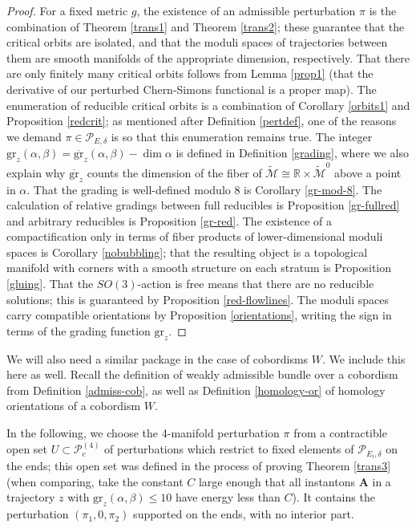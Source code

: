 \documentclass[10pt,a4paper]{amsart}
\theoremstyle{definition}
\theoremstyle{remark}
\numberwithin{figure}{qchap}
\begin{document}
\begin{proof}For a fixed metric $g$, the existence of an admissible perturbation $\pi$ is the combination of Theorem \ref{trans1} and Theorem \ref{trans2}; these guarantee that the critical orbits are isolated, and that the moduli spaces of trajectories between them are smooth manifolds of the appropriate dimension, respectively. That there are only finitely many critical orbits follows from Lemma \ref{prop1} (that the derivative of our perturbed Chern-Simons functional is a proper map). The enumeration of reducible critical orbits is a combination of Corollary \ref{orbits1} and Proposition \ref{redcrit}; as mentioned after Definition \ref{pertdef}, one of the reasons we demand $\pi \in \mathcal P_{E,\delta}$ is so that this enumeration remains true. The integer $\text{gr}_z(\alpha, \beta) = \overline{\text{gr}}_z(\alpha, \beta) - \dim \alpha$ is defined in Definition \ref{grading}, where we also explain why $\overline{\text{gr}}_z$ counts the dimension of the fiber of $\widetilde{\mathcal M} \cong \mathbb R \times \widetilde{\mathcal M}^0$ above a point in $\alpha$. That the grading is well-defined modulo $8$ is Corollary \ref{gr-mod-8}. The calculation of relative gradings between full reducibles is Proposition \ref{gr-fullred} and arbitrary reducibles is Proposition \ref{gr-red}. The existence of a compactification only in terms of fiber products of lower-dimensional moduli spaces is Corollary \ref{nobubbling}; that the resulting object is a topological manifold with corners with a smooth structure on each stratum is Proposition \ref{gluing}. That the $SO(3)$-action is free means that there are no reducible solutions; this is guaranteed by Proposition \ref{red-flowlines}. The moduli spaces carry compatible orientations by Proposition \ref{orientations}, writing the sign in terms of the grading function $\text{gr}_z$.
\end{proof}

We will also need a similar package in the case of cobordisms $W$. We include this here as well. Recall the definition of weakly admissible bundle over a cobordism from Definition \ref{admiss-cob}, as well as Definition \ref{homology-or} of homology orientations of a cobordism $W$.

In the following, we choose the 4-manifold perturbation $\pi$ from a contractible open set $U \subset \mathcal P^{(4)}_c$ of perturbations which restrict to fixed elements of $\mathcal P_{E_i, \delta}$ on the ends; this open set was defined in the process of proving Theorem \ref{trans3} (when comparing, take the constant $C$ large enough that all instantons $\mathbf{A}$ in a trajectory $z$ with $\text{gr}_z(\alpha, \beta) \leq 10$ have energy less than $C$). It contains the perturbation $(\pi_1, 0, \pi_2)$ supported on the ends, with no interior part. 
\end{document}

